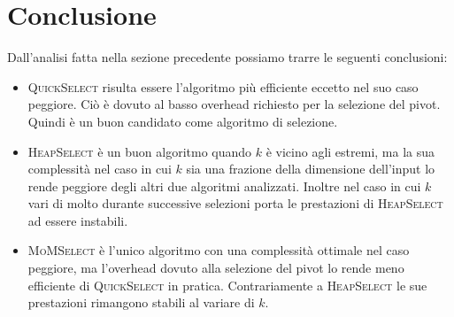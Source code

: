 \documentclass[a4paper,12pt]{article}
\newcommand{\QuickSelect}{\textsc{QuickSelect}}
\newcommand{\HeapSelect}{\textsc{HeapSelect}}
\newcommand{\MoMSelect}{\textsc{MoMSelect}}
\begin{document}
\section{Conclusione}
Dall'analisi fatta nella sezione precedente possiamo trarre le seguenti conclusioni:
\begin{itemize}
	\item \QuickSelect{} risulta essere l'algoritmo più efficiente eccetto nel suo caso peggiore.
		Ciò è dovuto al basso overhead richiesto per la selezione del pivot.
		Quindi è un buon candidato come algoritmo di selezione.
	\item \HeapSelect{} è un buon algoritmo quando $k$ è vicino agli estremi, ma la sua complessità nel caso in cui $k$ sia una frazione della dimensione dell'input lo rende peggiore degli altri due algoritmi analizzati.
		Inoltre nel caso in cui $k$ vari di molto durante successive selezioni porta le prestazioni di \HeapSelect{} ad essere instabili.
	\item \MoMSelect{} è l'unico algoritmo con una complessità ottimale nel caso peggiore, ma l'overhead dovuto alla selezione del pivot lo rende meno efficiente di \QuickSelect{} in pratica.
		Contrariamente a \HeapSelect{} le sue prestazioni rimangono stabili al variare di $k$.
\end{itemize}
\end{document}
